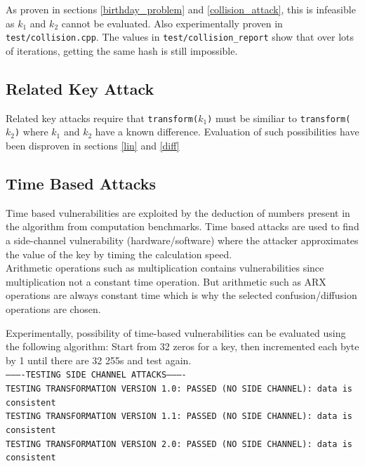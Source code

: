 \documentclass[11pt]{article}
\theoremstyle{definition}
\theoremstyle{remark}
\begin{document}

As proven in sections \ref{birthday_problem} and \ref{collision_attack}, this is infeasible as $k_1$ and $k_2$ cannot be evaluated. Also experimentally proven in \texttt{test/collision.cpp}. The values in \texttt{test/collision\_report} show that over lots of iterations, getting the same hash is still impossible.

\subsection{Related Key Attack}


Related key attacks require that \texttt{transform($k_1$)} must be similiar to \texttt{transform($k_2$)} where $k_1$ and $k_2$ have a known difference. Evaluation of such possibilities have been disproven in sections \ref{lin} and \ref{diff}

\subsection{Time Based Attacks}

Time based vulnerabilities are exploited by the deduction of numbers present in the algorithm from computation benchmarks. Time based attacks are used to find a side-channel vulnerability (hardware/software) where the attacker approximates the value of the key by timing the calculation speed.
\\
Arithmetic operations such as multiplication contains vulnerabilities since multiplication not a constant time operation. But arithmetic such as ARX operations are always constant time which is why the selected confusion/diffusion operations are chosen.

Experimentally, possibility of time-based vulnerabilities can be evaluated using the following algorithm:
Start from 32 zeros for a key, then incremented each byte by 1 until there are 32 255s and test again. 
\\
\texttt{----------TESTING SIDE CHANNEL ATTACKS----------\\
TESTING TRANSFORMATION VERSION 1.0: PASSED (NO SIDE CHANNEL): data is consistent\\
TESTING TRANSFORMATION VERSION 1.1: PASSED (NO SIDE CHANNEL): data is consistent\\
TESTING TRANSFORMATION VERSION 2.0: PASSED (NO SIDE CHANNEL): data is consistent}\\
\end{document}
